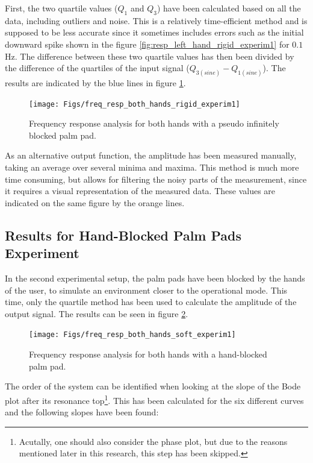 	First, the two quartile values ($Q_1$ and $Q_3$) have been calculated based on all the data, including outliers and noise. This is a relatively time-efficient method and is supposed to be less accurate since it sometimes includes errors such as the initial downward spike shown in the figure \ref{fig:resp_left_hand_rigid_experim1} for $0.1$Hz. The difference between these two quartile values has then been divided by the difference of the quartiles of the input signal ($Q_{3(sine)} - Q_{1(sine)}$). The results are indicated by the blue lines in figure \ref{fig:freq_resp_both_hands_rigid_experim1}.
	
	
	\begin{figure}[h!]
		\centering
		\texttt{[image: Figs/freq\_resp\_both\_hands\_rigid\_experim1]}
		\caption{Frequency response analysis for both hands with a pseudo infinitely blocked palm pad.}
		\label{fig:freq_resp_both_hands_rigid_experim1}
	\end{figure}

	As an alternative output function, the amplitude has been measured manually, taking an average over several minima and maxima. This method is much more time consuming, but allows for filtering the noisy parts of the measurement, since it requires a visual representation of the measured data. These values are indicated on the same figure by the orange lines.
	
	\subsection{Results for Hand-Blocked Palm Pads Experiment}
	In the second experimental setup, the palm pads have been blocked by the hands of the user, to simulate an environment closer to the operational mode. This time, only the quartile method has been used to calculate the amplitude of the output signal. The results can be seen in figure \ref{fig:freq_resp_both_hands_soft_experim1}.
	\begin{figure}
		\centering
		\texttt{[image: Figs/freq\_resp\_both\_hands\_soft\_experim1]}
		\caption{Frequency response analysis for both hands with a hand-blocked palm pad.}
		\label{fig:freq_resp_both_hands_soft_experim1}
	\end{figure}
	
	The order of the system can be identified when looking at the slope of the Bode plot after its resonance top\footnote{Acutally, one should also consider the phase plot, but due to the reasons mentioned later in this research, this step has been skipped.}. This has been calculated for the six different curves and the following slopes have been found:
	
